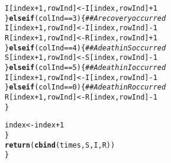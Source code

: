 \documentclass{article}\usepackage[]{graphicx}\usepackage[]{color}
\makeatletter
\newcommand{\hlnum}[1]{\textcolor[rgb]{0.686,0.059,0.569}{#1}}%
\newcommand{\hlcom}[1]{\textcolor[rgb]{0.678,0.584,0.686}{\textit{#1}}}%
\newcommand{\hlopt}[1]{\textcolor[rgb]{0,0,0}{#1}}%
\newcommand{\hlstd}[1]{\textcolor[rgb]{0.345,0.345,0.345}{#1}}%
\newcommand{\hlkwa}[1]{\textcolor[rgb]{0.161,0.373,0.58}{\textbf{#1}}}%
\newcommand{\hlkwb}[1]{\textcolor[rgb]{0.69,0.353,0.396}{#1}}%
\newcommand{\hlkwd}[1]{\textcolor[rgb]{0.737,0.353,0.396}{\textbf{#1}}}%
\newenvironment{kframe}{%
 \def\at@end@of@kframe{}%
 \ifinner\ifhmode%
  \def\at@end@of@kframe{\end{minipage}}%
  \begin{minipage}{\columnwidth}%
 \fi\fi%
 \def\FrameCommand##1{\hskip\@totalleftmargin \hskip-\fboxsep
 \colorbox{shadecolor}{##1}\hskip-\fboxsep
     \hskip-\linewidth \hskip-\@totalleftmargin \hskip\columnwidth}%
 \MakeFramed {\advance\hsize-\width
   \@totalleftmargin\z@ \linewidth\hsize
   \@setminipage}}%
 {\par\unskip\endMakeFramed%
 \at@end@of@kframe}
\newenvironment{knitrout}{}{} %
\makeatother
\begin{document}
\begin{knitrout}
\begin{kframe}
\begin{alltt}
      \hlstd{I[index}\hlopt{+}\hlnum{1}\hlstd{,rowInd]} \hlkwb{<-} \hlstd{I[index,rowInd]}\hlopt{+}\hlnum{1}
    \hlstd{\}}\hlkwa{else if}\hlstd{(colInd} \hlopt{==}\hlnum{3}\hlstd{)\{}  \hlcom{##A recovery occurred}
      \hlstd{I[index}\hlopt{+}\hlnum{1}\hlstd{,rowInd]} \hlkwb{<-} \hlstd{I[index,rowInd]}\hlopt{-}\hlnum{1}
      \hlstd{R[index}\hlopt{+}\hlnum{1}\hlstd{,rowInd]} \hlkwb{<-} \hlstd{R[index,rowInd]}\hlopt{+}\hlnum{1}
    \hlstd{\}}\hlkwa{else if}\hlstd{(colInd} \hlopt{==}\hlnum{4}\hlstd{)\{}  \hlcom{##A death in S occurred}
      \hlstd{S[index}\hlopt{+}\hlnum{1}\hlstd{,rowInd]} \hlkwb{<-} \hlstd{S[index,rowInd]}\hlopt{-}\hlnum{1}
    \hlstd{\}}\hlkwa{else if}\hlstd{(colInd} \hlopt{==}\hlnum{5}\hlstd{)\{}  \hlcom{##A death in I occurred}
      \hlstd{I[index}\hlopt{+}\hlnum{1}\hlstd{,rowInd]} \hlkwb{<-} \hlstd{I[index,rowInd]}\hlopt{-}\hlnum{1}
    \hlstd{\}}\hlkwa{else if}\hlstd{(colInd} \hlopt{==}\hlnum{0}\hlstd{)\{}  \hlcom{##A death in R occurred}
      \hlstd{R[index}\hlopt{+}\hlnum{1}\hlstd{,rowInd]} \hlkwb{<-}  \hlstd{R[index,rowInd]}\hlopt{-}\hlnum{1}
    \hlstd{\}}

    \hlstd{index} \hlkwb{<-} \hlstd{index}\hlopt{+}\hlnum{1}
  \hlstd{\}}
  \hlkwd{return}\hlstd{(}\hlkwd{cbind}\hlstd{(times, S, I, R))}
\hlstd{\}}
\end{alltt}
\end{kframe}
\end{knitrout}
\end{document}

